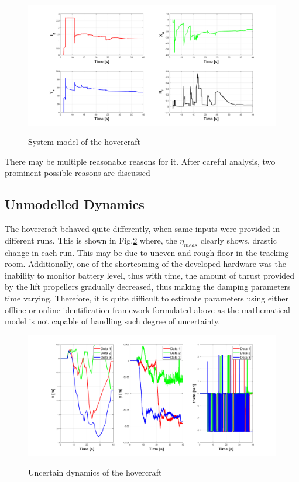 \documentclass[12pt,titlepage]{article}
\begin{document}
\begin{figure}[H]
    \centering
    \includegraphics[width=1\columnwidth]{Images/param_ident_ukf.png}\\
    \caption{System model of the hovercraft}
    \label{fig:ukfidentmodel}
\end{figure}

There may be multiple reasonable reasons for it. After careful analysis, two prominent possible reasons are discussed - 

\subsection*{Unmodelled Dynamics}
The hovercraft behaved quite differently, when same inputs were provided in different runs. This is shown in Fig.\ref{fig:uncertain} where, the $\eta_{meas}$ clearly shows, drastic change in each run. This may be due to uneven and rough floor in the tracking room. Additionally, one of the shortcoming of the developed hardware was the inability to monitor battery level, thus with time, the amount of thrust provided by the lift propellers gradually decreased, thus making the damping parameters time varying. Therefore, it is quite difficult to estimate parameters using either offline or online identification framework formulated above as the mathematical model is not capable of handling such degree of uncertainty. 

\begin{figure}[H]
    \centering
    \includegraphics[width=1\columnwidth]{Images/dynamics_error.png}\\
    \caption{Uncertain dynamics of the hovercraft}
    \label{fig:uncertain}
\end{figure}
\end{document}
